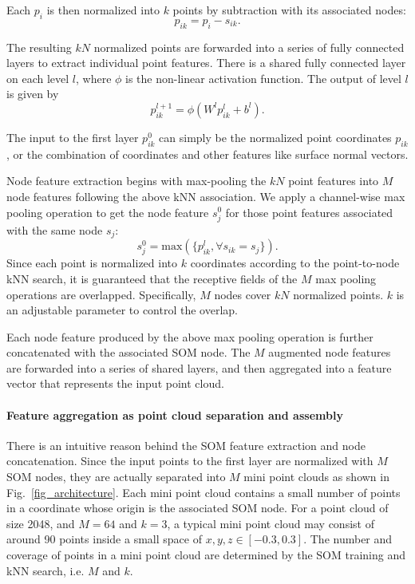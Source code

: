 \documentclass[10pt,twocolumn,letterpaper]{article}
\begin{document}
\noindent Each $p_i$ is then normalized into $k$ points by subtraction with its associated nodes:
\begin{equation} \label{equ_pik}
    p_{ik} = p_i - s_{ik}.
\end{equation}

\noindent The resulting $kN$ normalized points are forwarded into a series of fully connected layers to extract individual point features. There is a shared fully connected layer on each level $l$, where $\phi$ is the non-linear activation function. The output of level $l$ is given by
\begin{equation} \label{equ_fc}
    p_{ik}^{l+1} = \phi(W^l p_{ik}^l + b^l).
\end{equation}

\noindent The input to the first layer $p_{ik}^0$ can simply be the normalized point coordinates $p_{ik}$, or the combination of coordinates and other features like surface normal vectors.

Node feature extraction begins with max-pooling the $kN$ point features into $M$ node features following the above kNN association. We apply a channel-wise max pooling operation to get the node feature $s_j^0$ for those point features associated with the same node $s_j$:
\begin{equation} \label{equ_som_pool}
    s_j^0 = \text{max}(\{p_{ik}^l, \forall s_{ik}=s_j\}).
\end{equation}
Since each point is normalized into $k$ coordinates according to the point-to-node kNN search, it is guaranteed that the receptive fields of the $M$ max pooling operations are overlapped. Specifically, $M$ nodes cover $kN$ normalized points. $k$ is an adjustable parameter to control the overlap. 

Each node feature produced by the above max pooling operation is further concatenated with the associated SOM node. The $M$ augmented node features are forwarded into a series of shared layers, and then aggregated into a feature vector that represents the input point cloud.

\paragraph{Feature aggregation as point cloud separation and assembly}
There is an intuitive reason behind the SOM feature extraction and node concatenation. Since the input points to the first layer are normalized with $M$ SOM nodes, they are actually separated into $M$ mini point clouds as shown in Fig.~\ref{fig_architecture}. Each mini point cloud contains a small number of points in a coordinate whose origin is the associated SOM node. For a point cloud of size 2048, and $M=64$ and $k=3$, a typical mini point cloud may consist of around 90 points inside a small space of $x,y,z\in[-0.3, 0.3]$. The number and coverage of points in a mini point cloud are determined by the SOM training and kNN search, i.e. $M$ and $k$. 
\end{document}
